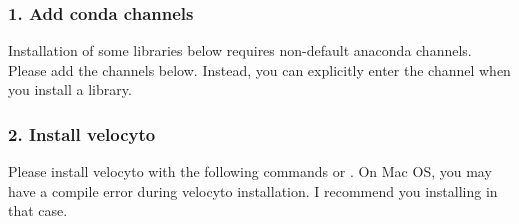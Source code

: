 \documentclass[letterpaper,10pt,english]{sphinxmanual}
\begin{document}
%
\begin{sphinxVerbatim}[commandchars=\\\{\}]
    
  
\end{sphinxVerbatim}


\subsubsection{1. Add conda channels}
\label{\detokenize{installation/index:add-conda-channels}}
Installation of some libraries below requires non-default anaconda channels. Please add the channels below. Instead, you can explicitly enter the channel when you install a library.

%
\begin{sphinxVerbatim}[commandchars=\\\{\}]
    
    
    
\end{sphinxVerbatim}


\subsubsection{2. Install velocyto}
\label{\detokenize{installation/index:install-velocyto}}
Please install velocyto with the following commands or  .
On Mac OS, you may have a compile error during velocyto installation. I recommend you installing  in that case.

%
\begin{sphinxVerbatim}[commandchars=\\\{\}]
         
\end{sphinxVerbatim}
\end{document}
